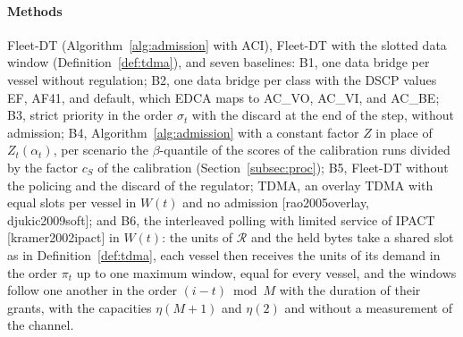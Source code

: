 \paragraph*{Methods} Fleet-DT (Algorithm~\ref{alg:admission} with ACI), Fleet-DT with the slotted data window (Definition~\ref{def:tdma}), and seven baselines: B1, one data bridge per vessel without regulation; B2, one data bridge per class with the DSCP values EF, AF41, and default, which EDCA maps to AC\_VO, AC\_VI, and AC\_BE; B3, strict priority in the order $\sigma_t$ with the discard at the end of the step, without admission; B4, Algorithm~\ref{alg:admission} with a constant factor $Z$ in place of $Z_t(\alpha_t)$, per scenario the $\beta$-quantile of the scores of the calibration runs divided by the factor $c_S$ of the calibration (Section~\ref{subsec:proc}); B5, Fleet-DT without the policing and the discard of the regulator; TDMA, an overlay TDMA with equal slots per vessel in $W(t)$ and no admission [rao2005overlay, djukic2009soft]; and B6, the interleaved polling with limited service of IPACT [kramer2002ipact] in $W(t)$: the units of $\mathcal{R}$ and the held bytes take a shared slot as in Definition~\ref{def:tdma}, each vessel then receives the units of its demand in the order $\pi_t$ up to one maximum window, equal for every vessel, and the windows follow one another in the order $(i - t) \bmod M$ with the duration of their grants, with the capacities $\eta(M+1)$ and $\eta(2)$ and without a measurement of the channel.

